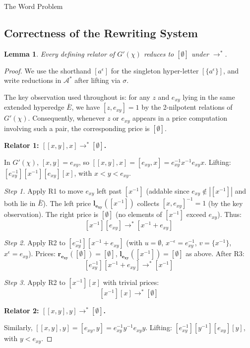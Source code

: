 \documentclass{article}
\newtheorem{lemma}[theorem]{Lemma}
\theoremstyle{definition}
\theoremstyle{remark}
\theoremstyle{theorem}
\theoremstyle{definition}
\begin{document}
\begin{section}{The Word Problem}

\subsection{Correctness of the Rewriting System}

\begin{lemma}
Every defining relator of
$G'(\chi)$ reduces to $[\emptyset]$ under $\to^*$.
\end{lemma}
\begin{proof}

We use the shorthand $[a^\epsilon]$ for the singleton hyper-letter
$[\{a^\epsilon\}]$, and write reductions in $\mathcal{A}^*$ after lifting
via $\sigma$.

The key observation used throughout is: for any $z$ and $e_{xy}$ lying
in the same extended hyperedge $\bar{E}$, we have $[z, e_{xy}] = 1$ by
the 2-nilpotent relations of $G'(\chi)$. Consequently, whenever $z$ or
$e_{xy}$ appears in a price computation involving such a pair, the
corresponding price is $[\emptyset]$.

\medskip
\noindent\textbf{Relator 1: $[[x,y],x] \to^* [\emptyset]$.}

In $G'(\chi)$, $[x,y]=e_{xy}$, so $[[x,y],x] = [e_{xy},x] = e_{xy}^{-1}x^{-1}e_{xy}x$.
Lifting: $[e_{xy}^{-1}][x^{-1}][e_{xy}][x]$, with $x < y < e_{xy}$.

\textit{Step 1.} Apply R1 to move $e_{xy}$ left past $[x^{-1}]$ (addable since $e_{xy} \notin |[x^{-1}]|$ and both lie in $\bar{E}$). The left price $\mathbf{l_{e_{xy}}}([x^{-1}])$ collects $[x, e_{xy}]^{-1} = 1$ (by the key observation). The right price is $[\emptyset]$ (no elements of $[x^{-1}]$ exceed $e_{xy}$). Thus:
$$[x^{-1}][e_{xy}] \to^* [x^{-1}+e_{xy}]$$

\textit{Step 2.} Apply R2 to $[e_{xy}^{-1}][x^{-1}+e_{xy}]$ (with $u=\emptyset$, $x^{-\epsilon}=e_{xy}^{-1}$, $v=\{x^{-1}\}$, $x^\epsilon=e_{xy}$). Prices: $\mathbf{r_{e_{xy}}}([\emptyset])=[\emptyset]$, $\mathbf{l_{e_{xy}}}([x^{-1}])=[\emptyset]$ as above. After R3:
$$[e_{xy}^{-1}][x^{-1}+e_{xy}] \to^* [x^{-1}]$$

\textit{Step 3.} Apply R2 to $[x^{-1}][x]$ with trivial prices:
$$[x^{-1}][x] \to^* [\emptyset]$$

\medskip
\noindent\textbf{Relator 2: $[[x,y],y] \to^* [\emptyset]$.}

Similarly, $[[x,y],y]=[e_{xy},y]=e_{xy}^{-1}y^{-1}e_{xy}y$.
Lifting: $[e_{xy}^{-1}][y^{-1}][e_{xy}][y]$, with $y < e_{xy}$.


\end{proof}
\end{section}
\end{document}
